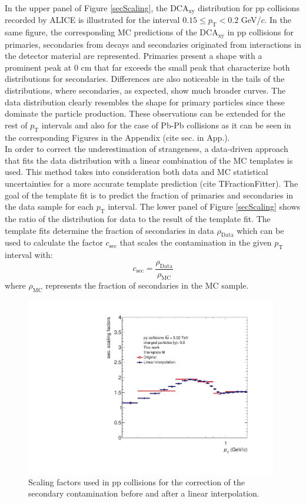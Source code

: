 \documentclass[12pt,a4paper]{report}
\begin{document}
In the upper panel of Figure \ref{secScaling}, the DCA$_{\text{xy}}$ distribution for pp collisions recorded by ALICE is illustrated for the \pt interval $0.15 \leq p_\text{T} < 0.2 $ GeV/$c$. In the same figure, the corresponding MC predictions of the DCA$_{\text{xy}}$ in pp collisions for primaries, secondaries from decays and secondaries originated from interactions in the detector material are represented. Primaries present a shape with a prominent peak at $0$ cm that far exceeds the small peak that characterize both distributions for secondaries. Differences are also noticeable in the tails of the distributions, where secondaries, as expected, show much broader curves. The data distribution clearly resembles the shape for primary particles since these dominate the particle production. These observations can be extended for the rest of $p_\text{T}$ intervals and also for the case of Pb-Pb collisions as it can be seen in the corresponding Figures in the Appendix (cite sec. in App.). \\
In order to correct the underestimation of strangeness, a data-driven approach that fits the data distribution with a linear combination of the MC templates is used. This method takes into consideration both data and MC statistical uncertainties for a more accurate template prediction (cite TFractionFitter). The goal of the template fit is to predict the fraction of primaries and secondaries in the data sample for each $p_\text{T}$ interval. The lower panel of Figure \ref{secScaling} shows the ratio of the distribution for data to the result of the template fit. The template fits determine the fraction of secondaries in data $\rho_\text{Data}$ which can be used to calculate the factor $c_\text{sec}$ that scales the contamination in the given $p_\text{T}$ interval with:
\begin{equation}
c_\text{sec} = \dfrac{\rho_\text{Data}}{\rho_\text{MC}}
\end{equation}
where $\rho_\text{MC}$ represents the fraction of secondaries in the MC sample. 
\begin{figure}[tb!]
\centering
\includegraphics[width=11cm]{Plots/secscalingfactors.pdf}  
\caption{Scaling factors used in pp collisions for the correction of the secondary contamination before and after a linear interpolation.}
\label{scalefactors} 
\end{figure}
\end{document}
